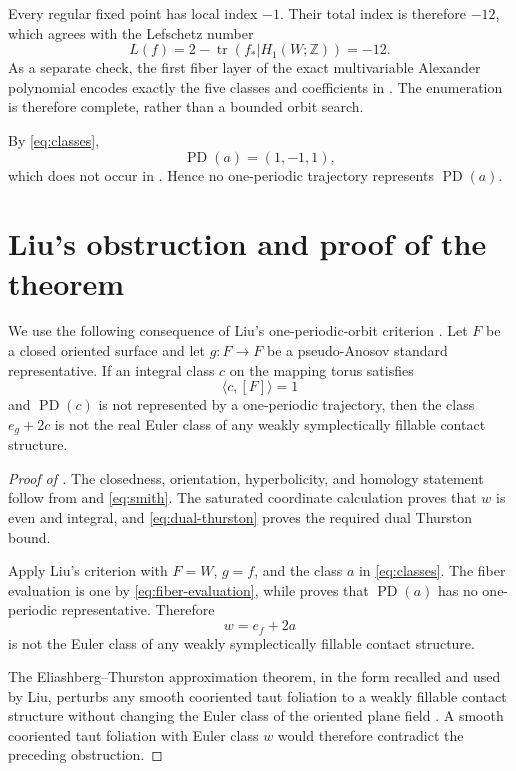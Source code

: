 \documentclass[10pt,reqno]{amsart}
\theoremstyle{definition}
\newcommand{\Z}{\mathbb Z}
\newcommand{\PD}{\operatorname{PD}}
\newcommand{\tr}{\operatorname{tr}}
\begin{document}
Every regular fixed point has local index \(-1\).  Their total index is
therefore \(-12\), which agrees with the Lefschetz number
\[
 L(f)=2-\tr(f_*|H_1(W;\Z))=-12.
\]
As a separate check, the first fiber layer of the exact multivariable
Alexander polynomial encodes exactly the five classes and coefficients in
.  The enumeration is therefore complete, rather than a
bounded orbit search.

By \eqref{eq:classes},
\[
 \PD(a)=(1,-1,1),
\]
which does not occur in .  Hence no one-periodic
trajectory represents \(\PD(a)\).

\section{Liu's obstruction and proof of the theorem}

We use the following consequence of Liu's one-periodic-orbit criterion
\cite[Lemma~3.2]{Liu}.  Let \(F\) be a closed oriented surface and let
\(g\colon F\to F\) be a pseudo-Anosov standard representative.  If an
integral class \(c\) on the mapping torus satisfies
\[
 \langle c,[F]\rangle=1
\]
and \(\PD(c)\) is not represented by a one-periodic trajectory, then the
class \(e_g+2c\) is not the real Euler class of any weakly symplectically
fillable contact structure.

\begin{proof}[Proof of ]
The closedness, orientation, hyperbolicity, and homology statement follow
from  and \eqref{eq:smith}.  The saturated coordinate
calculation proves that \(w\) is even and integral, and
\eqref{eq:dual-thurston} proves the required dual Thurston bound.

Apply Liu's criterion with \(F=W\), \(g=f\), and the class \(a\) in
\eqref{eq:classes}.  The fiber evaluation is one by
\eqref{eq:fiber-evaluation}, while  proves that
\(\PD(a)\) has no one-periodic representative.  Therefore
\[
 w=e_f+2a
\]
is not the Euler class of any weakly symplectically fillable contact
structure.

The Eliashberg--Thurston approximation theorem, in the form recalled and used
by Liu, perturbs any smooth cooriented taut foliation to a weakly fillable
contact structure without changing the Euler class of the oriented plane
field \cite{EliashbergThurston,Liu}.  A smooth cooriented taut foliation with
Euler class \(w\) would therefore contradict the preceding obstruction.
\end{proof}
\end{document}
